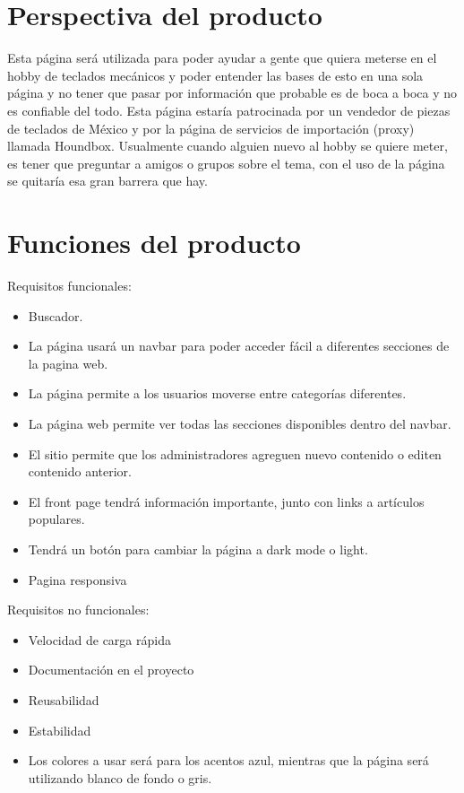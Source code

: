 \documentclass{scrreprt}
\begin{document}
		\section{Perspectiva del producto}
	Esta página será utilizada para poder ayudar a gente que quiera meterse en el hobby de teclados mecánicos y poder entender las bases de esto en una sola página y no tener que pasar por información que probable es de boca a boca y no es confiable del todo. Esta página estaría patrocinada por un vendedor de piezas de teclados de México y por la página de servicios de importación (proxy) llamada Houndbox. Usualmente cuando alguien nuevo al hobby se quiere meter, es tener que preguntar a amigos o grupos sobre el tema, con el uso de la página se quitaría esa gran barrera que hay.
	
		\section{Funciones del producto}
Requisitos funcionales:
\begin{itemize}
	\item Buscador.
	\item La página usará un navbar para poder acceder fácil a diferentes secciones de la pagina web.
	\item La página permite a los usuarios moverse entre categorías diferentes.
	\item La página web permite ver todas las secciones disponibles dentro del navbar.
	\item El sitio permite que los administradores agreguen nuevo contenido o editen contenido anterior.
	\item El front page tendrá información importante, junto con links a artículos populares.
	\item Tendrá un botón para cambiar la página a dark mode o light.
	\item Pagina responsiva
\end{itemize}
Requisitos no funcionales:
\begin{itemize}
	\item Velocidad de carga rápida
	\item Documentación en el proyecto
	\item Reusabilidad
	\item Estabilidad
	\item Los colores a usar será para los acentos azul, mientras que la página será utilizando blanco de fondo o gris.
\end{itemize}
	
\end{document}
